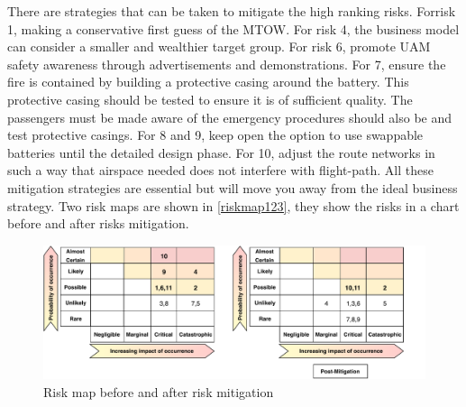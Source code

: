 There are strategies that can be taken to mitigate the high ranking risks. Forrisk  1, making a conservative first guess of the MTOW. For risk 4, the business model can consider a smaller and wealthier target group. For risk 6, promote UAM safety awareness through advertisements and demonstrations. For 7, ensure the fire is contained by building a protective casing around the battery. This protective casing should be tested to ensure it is of sufficient quality. The passengers must be made aware of the emergency procedures should also be  and test protective casings. For 8 and 9, keep open the option to use swappable batteries until the detailed design phase. For 10, adjust the route networks in such a way that airspace needed does not interfere with flight-path. All these mitigation strategies are essential but will move you away from the ideal business strategy. Two risk maps are shown in \autoref{riskmap123}, they show the risks in a chart before and after risks mitigation. 

\begin{figure}[H]
    \centering
    \includegraphics[width = \linewidth]{Figures/riskmap.pdf}    
    \caption{Risk map before and after risk mitigation}
    \label{fig:riskmap123}
\end{figure}


